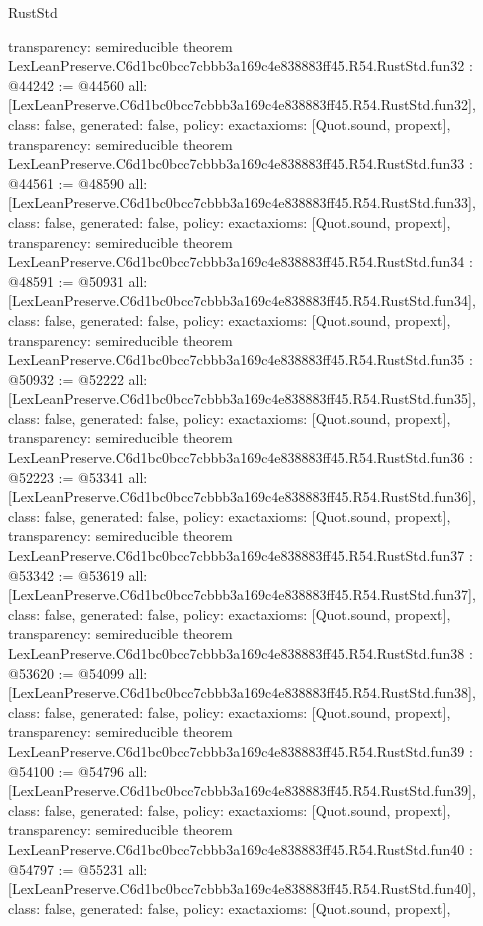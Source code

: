 \begin{lexlean}{RustStd}
\begin{coremodule}
{  transparency: semireducible
}
theorem LexLeanPreserve.C6d1bc0bcc7cbbb3a169c4e838883ff45.R54.RustStd.fun32 : @44242 := @44560 {
  all: [LexLeanPreserve.C6d1bc0bcc7cbbb3a169c4e838883ff45.R54.RustStd.fun32],
  class: false,
  generated: false,
  policy: exact{axioms: [Quot.sound, propext]},
  transparency: semireducible
}
theorem LexLeanPreserve.C6d1bc0bcc7cbbb3a169c4e838883ff45.R54.RustStd.fun33 : @44561 := @48590 {
  all: [LexLeanPreserve.C6d1bc0bcc7cbbb3a169c4e838883ff45.R54.RustStd.fun33],
  class: false,
  generated: false,
  policy: exact{axioms: [Quot.sound, propext]},
  transparency: semireducible
}
theorem LexLeanPreserve.C6d1bc0bcc7cbbb3a169c4e838883ff45.R54.RustStd.fun34 : @48591 := @50931 {
  all: [LexLeanPreserve.C6d1bc0bcc7cbbb3a169c4e838883ff45.R54.RustStd.fun34],
  class: false,
  generated: false,
  policy: exact{axioms: [Quot.sound, propext]},
  transparency: semireducible
}
theorem LexLeanPreserve.C6d1bc0bcc7cbbb3a169c4e838883ff45.R54.RustStd.fun35 : @50932 := @52222 {
  all: [LexLeanPreserve.C6d1bc0bcc7cbbb3a169c4e838883ff45.R54.RustStd.fun35],
  class: false,
  generated: false,
  policy: exact{axioms: [Quot.sound, propext]},
  transparency: semireducible
}
theorem LexLeanPreserve.C6d1bc0bcc7cbbb3a169c4e838883ff45.R54.RustStd.fun36 : @52223 := @53341 {
  all: [LexLeanPreserve.C6d1bc0bcc7cbbb3a169c4e838883ff45.R54.RustStd.fun36],
  class: false,
  generated: false,
  policy: exact{axioms: [Quot.sound, propext]},
  transparency: semireducible
}
theorem LexLeanPreserve.C6d1bc0bcc7cbbb3a169c4e838883ff45.R54.RustStd.fun37 : @53342 := @53619 {
  all: [LexLeanPreserve.C6d1bc0bcc7cbbb3a169c4e838883ff45.R54.RustStd.fun37],
  class: false,
  generated: false,
  policy: exact{axioms: [Quot.sound, propext]},
  transparency: semireducible
}
theorem LexLeanPreserve.C6d1bc0bcc7cbbb3a169c4e838883ff45.R54.RustStd.fun38 : @53620 := @54099 {
  all: [LexLeanPreserve.C6d1bc0bcc7cbbb3a169c4e838883ff45.R54.RustStd.fun38],
  class: false,
  generated: false,
  policy: exact{axioms: [Quot.sound, propext]},
  transparency: semireducible
}
theorem LexLeanPreserve.C6d1bc0bcc7cbbb3a169c4e838883ff45.R54.RustStd.fun39 : @54100 := @54796 {
  all: [LexLeanPreserve.C6d1bc0bcc7cbbb3a169c4e838883ff45.R54.RustStd.fun39],
  class: false,
  generated: false,
  policy: exact{axioms: [Quot.sound, propext]},
  transparency: semireducible
}
theorem LexLeanPreserve.C6d1bc0bcc7cbbb3a169c4e838883ff45.R54.RustStd.fun40 : @54797 := @55231 {
  all: [LexLeanPreserve.C6d1bc0bcc7cbbb3a169c4e838883ff45.R54.RustStd.fun40],
  class: false,
  generated: false,
  policy: exact{axioms: [Quot.sound, propext]},
}
\end{coremodule}
\end{lexlean}
